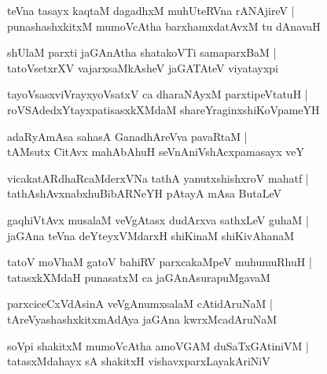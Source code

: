 \documentclass[twoside,12pt,openright]{book}
\newcounter{shloka}[chapter]
\begin{document}
\begin{shloka}%
teVna tasayx kaqtaM dagadhxM muhUteRVna rANAjireV |\\
punashashxkitxM mumoVcAtha barxhamxdatAvxM tu dAnavaH 
\end{shloka}

\begin{shloka}%
shUlaM parxti jaGAnAtha shatakoVTi samaparxBaM |\\
tatoVsetxrXV vajarxsaMkAsheV jaGATAteV viyatayxpi
\end{shloka}

\begin{shloka}%
tayoVsasxviVrayxyoVsatxV ca dharaNAyxM parxtipeVtatuH |\\
roVSAdedxYtayxpatisasxkXMdaM shareYraginxshiKoVpameYH
\end{shloka}

\begin{shloka}%
adaRyAmAsa sahasA GanadhAreVva pavaRtaM |\\
tAMsutx CitAvx mahAbAhuH seVnAniVshAcxpamasayx veY
\end{shloka}

\begin{shloka}%
vicakatARdhaRcaMderxVNa tathA yanutxshishxroV mahatf |\\
tathAshAvxnabxhuBibARNeYH pAtayA mAsa ButaLeV
\end{shloka}

\begin{shloka}%
gaqhiVtAvx musalaM veVgAtasx dudArxva sathxLeV guhaM |\\
jaGAna teVna deYteyxVMdarxH shiKinaM shiKivAhanaM 
\end{shloka}

\begin{shloka}%
tatoV moVhaM gatoV bahiRV parxcakaMpeV muhumuRhuH |\\
tatasxkXMdaH punasatxM ca jaGAnAsurapuMgavaM 
\end{shloka}

\begin{shloka}%
parxciceCxVdAsinA veVgAnumxsalaM cAtidAruNaM |\\
tAreVyashashxkitxmAdAya jaGAna kwrxMcadAruNaM 
\end{shloka}

\begin{shloka}%
soVpi shakitxM mumoVcAtha amoVGAM duSaTxGAtiniVM |\\
tatasxMdahayx sA shakitxH vishavxparxLayakAriNiV 
\end{shloka}
\end{document}
